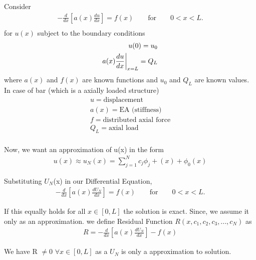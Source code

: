 Consider\\
\begin{eqnarray}
	-\frac{d}{dx} \left[a(x)\frac{du}{dx} \right] = f(x)  \quad\quad  \text{for} \quad\quad  0<x<L.\\
\end{eqnarray}
for $u(x)$ subject to the boundary conditions\\
\begin{eqnarray}
	u(0)= u_0 \\
	\vspace{1cm}
	a(x)\frac{du}{dx}\biggr|_{x=L} = Q_L	
\end{eqnarray}
where $a(x)$ and $f(x)$ are known functions and 
$u_0$ and $Q_L$ are known values.
In case of bar (which is a axially loaded structure)\\

\begin{eqnarray*}
	u = \text{displacement}\\
	a(x)= \text{EA (stiffness)}\\
	f = \text{distributed axial force}\\
	Q_L= \text{axial load}\\
\end{eqnarray*}

Now, we want an approximation of u(x) in the form
\begin{eqnarray}
	u(x)\approx u_N(x) = \sum\limits_{j=1}^N c_j\phi_{j} + (x) +\phi_{0}(x)
\end{eqnarray}


 Substituting  $U_N$(x) in our Differential Equation,\\
 
 \begin{eqnarray}
 	-\frac{d}{dx} \left[a(x)\frac{dU_N}{dx} \right] = f(x)  \quad\quad  \text{for} \quad\quad  0<x<L.
 \end{eqnarray}

If this equally holds for all $x \in [0,L] $ the solution is exact. Since, we assume it only as an approximation.
we define Residual Function $R(x,c_1, c_2, c_3,...,c_N)$ as
\begin{eqnarray}
	R = -\frac{d}{dx} \left[a(x)\frac{dU_N}{dx} \right] - f(x)
\end{eqnarray} 

We have R $\neq$0 $ \forall x  \in [0, L]$  as a $U_N$ is only a approximation to solution.\\


